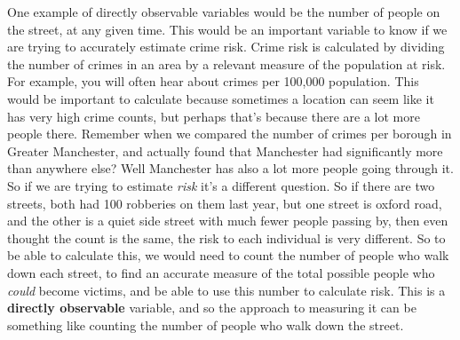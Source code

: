 \documentclass[]{book}
\theoremstyle{definition}
\theoremstyle{definition}
\theoremstyle{definition}
\theoremstyle{remark}
\begin{document}
One example of directly observable variables would be the number of
people on the street, at any given time. This would be an important
variable to know if we are trying to accurately estimate crime risk.
Crime risk is calculated by dividing the number of crimes in an area by
a relevant measure of the population at risk. For example, you will
often hear about crimes per 100,000 population. This would be important
to calculate because sometimes a location can seem like it has very high
crime counts, but perhaps that's because there are a lot more people
there. Remember when we compared the number of crimes per borough in
Greater Manchester, and actually found that Manchester had significantly
more than anywhere else? Well Manchester has also a lot more people
going through it. So if we are trying to estimate \emph{risk} it's a
different question. So if there are two streets, both had 100 robberies
on them last year, but one street is oxford road, and the other is a
quiet side street with much fewer people passing by, then even thought
the count is the same, the risk to each individual is very different. So
to be able to calculate this, we would need to count the number of
people who walk down each street, to find an accurate measure of the
total possible people who \emph{could} become victims, and be able to
use this number to calculate risk. This is a \textbf{directly
observable} variable, and so the approach to measuring it can be
something like counting the number of people who walk down the street.
\end{document}
